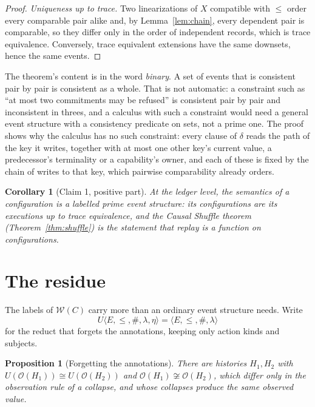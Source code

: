 \documentclass[11pt,openany]{book}
\newtheorem{proposition}[theorem]{Proposition}
\newtheorem{corollary}[theorem]{Corollary}
\theoremstyle{remark}
\begin{document}
\begin{proof}
\emph{Uniqueness up to trace.} Two linearizations of $X$ compatible with
$\le$ order every comparable pair alike and, by Lemma~\ref{lem:chain},
every dependent pair is comparable, so they differ only in the order of
independent records, which is trace equivalence. Conversely, trace
equivalent extensions have the same downsets, hence the same events.
\end{proof}

The theorem's content is in the word \emph{binary}. A set of events that
is consistent pair by pair is consistent as a whole. That is not automatic:
a constraint such as ``at most two commitments may be refused'' is
consistent pair by pair and inconsistent in threes, and a calculus with
such a constraint would need a general event structure with a consistency
predicate on sets, not a prime one. The proof shows why the calculus has
no such constraint: every clause of $\delta$ reads the path of the key it
writes, together with at most one other key's current value, a
predecessor's terminality or a capability's owner, and each of these is
fixed by the chain of writes to that key, which pairwise comparability
already orders.

\begin{corollary}[Claim 1, positive part]\label{cor:claim1}
At the ledger level, the semantics of a configuration is a labelled prime
event structure: its configurations are its executions up to trace
equivalence, and the Causal Shuffle theorem (Theorem~\ref{thm:shuffle})
is the statement that replay is a function on configurations.
\end{corollary}

\section{The residue}

The labels of $\mathcal W(C)$ carry more than an ordinary event structure
needs. Write
\[
U\langle E,\le,\#,\lambda,\eta\rangle=\langle E,\le,\#,\lambda\rangle
\]
for the reduct that forgets the annotations, keeping only action kinds and
subjects.

\begin{proposition}[Forgetting the annotations]\label{prop:forget}
There are histories $H_1,H_2$ with $U(\mathcal O(H_1))\cong
U(\mathcal O(H_2))$ and $\mathcal O(H_1)\not\cong\mathcal O(H_2)$, which
differ only in the observation rule of a collapse, and whose collapses
produce the same observed value.
\end{proposition}
\end{document}
